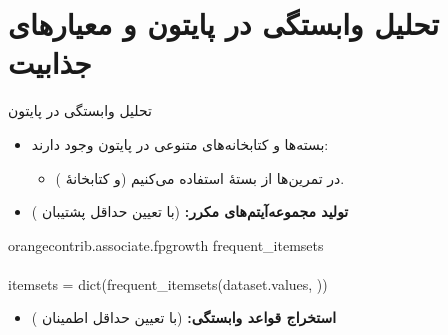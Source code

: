 \section{تحلیل وابستگی در پایتون و معیارهای جذابیت}

\begin{frame}[fragile]{تحلیل وابستگی در پایتون}{}
\begin{itemize}\setlength{\itemsep}{3pt}
    \item بسته‌ها و کتابخانه‌های متنوعی در پایتون وجود دارند:
    \begin{itemize}\setlength{\itemsep}{2pt}
        \item در تمرین‌ها از بستهٔ  استفاده می‌کنیم (و کتابخانهٔ ).
    \end{itemize}
    \vspace{0.15cm}
    \item \textbf{تولید مجموعه‌آیتم‌های مکرر:} {\small (با تعیین حداقل پشتیبان )}
\end{itemize}

\vspace{-0.1cm}
\begin{center}
\begin{minipage}{0.88\textwidth}
\begin{tcolorbox}[colback=codebg,colframe=codeborder,arc=3pt,left=6pt,right=6pt,top=4pt,bottom=4pt]
\begin{latin}
\fontsize{8.5}{11}\selectfont
\textbf{\color{blue!80!black}{from}} orangecontrib.associate.fpgrowth \textbf{\color{blue!80!black}{import}} frequent\_itemsets\\[3pt]
\textit{\color{gray}{\# Calculate frequent itemsets (min support = 0.20)}}\\
itemsets = dict(frequent\_itemsets(dataset.values, \textbf{\color{red!80!black}{0.20}}))
\end{latin}
\end{tcolorbox}
\end{minipage}
\end{center}

\begin{itemize}\setlength{\itemsep}{3pt}
    \item \textbf{استخراج قواعد وابستگی:} {\small (با تعیین حداقل اطمینان )}
\end{itemize}


\end{frame}
